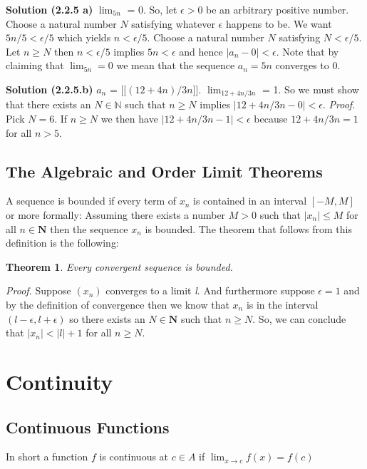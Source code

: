 \documentclass[10pt]{article}
\newtheorem{theorem}{Theorem}
\begin{document}
\textbf{Solution (2.2.5 a)}
$\lim_{5n}$ = 0. So, let $\epsilon > 0$ be an arbitrary positive number. Choose a natural number $N$ satisfying whatever $\epsilon$ happens to be. We want $5n/5 < \epsilon/5$ which yields $n < \epsilon / 5$. Choose a natural number $N$ satisfying  $N < \epsilon/5$. Let $n \ge N$ then  $n < \epsilon/5$ implies $5n < \epsilon$ and hence $\left|a_{n} - 0\right| < \epsilon$. Note that by claiming that $\lim_{5n} = 0$ we mean that the sequence $a_{n} = 5n$ converges to 0.

\textbf{Solution (2.2.5.b)}
$a_{n}$ = [[$(12+4n) / 3n$]].
$\lim_{12+4n/3n}$ = 1. So we must show that there exists an $N \in \mathbb{N}$ such that $n \ge N$ implies $\left|12+4n/3n-0\right| < \epsilon$. \textit{Proof.} Pick $N = 6$. If $n \ge N$ we then have $\left|12+4n/3n- 1\right| < \epsilon$ because $12+4n/3n = 1$ for all $n>5$.


\subsection{The Algebraic and Order Limit Theorems}
A sequence is bounded if every term of $x_{n}$ is contained in an interval $\left[-M, M\right]$ or more formally: Assuming there exists a number $M > 0$ such that $\left|x_{n}\right| \le M$ for all $n \in \mathbf{N}$ then the sequence $x_{n}$ is bounded. The theorem that follows from this definition is the following: 
\begin{theorem}
\textit{Every convergent sequence is bounded.}
\end{theorem}
\textit{Proof.} Suppose $\left(x_{n}\right)$ converges to a limit \textit{l}. And furthermore suppose $\epsilon = 1$ and by the definition of convergence then we know that $x_{n}$ is in the interval 
$\left(l-\epsilon, l+\epsilon\right)$ so there exists an $N \in \mathbf{N}$ such that $n \ge N$. So, we can conclude that $\left|x_{n}\right| < \left|l\right| + 1$ for all $n \ge N$.

\section{Continuity}
\subsection{Continuous Functions}
In short  a function $f$ is continuous at $c \in A$ if $\lim_{x\to c} f\left(x\right) = f\left(c\right)$
\end{document}
